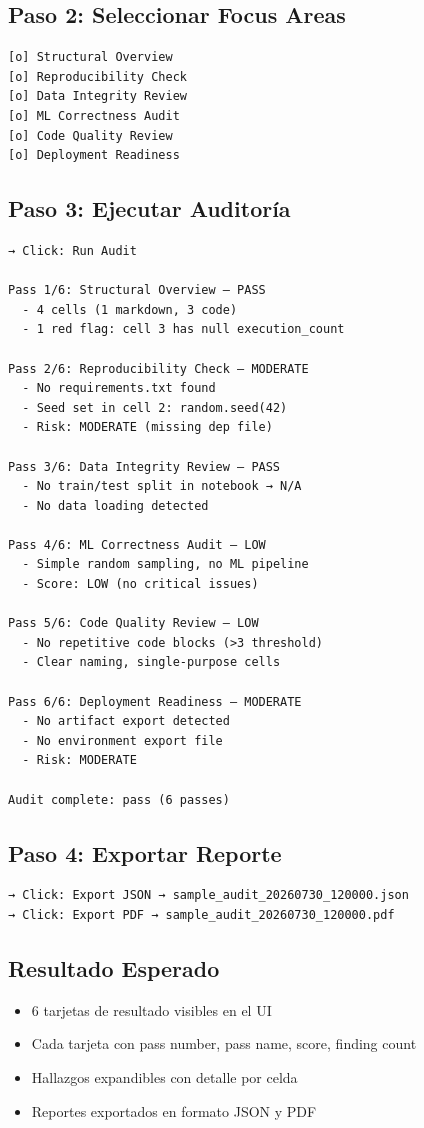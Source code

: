 \documentclass[12pt,a4paper]{article}
\begin{document}
\subsection{Paso 2: Seleccionar Focus Areas}

\begin{verbatim}
[o] Structural Overview
[o] Reproducibility Check
[o] Data Integrity Review
[o] ML Correctness Audit
[o] Code Quality Review
[o] Deployment Readiness
\end{verbatim}

\subsection{Paso 3: Ejecutar Auditoría}

\begin{verbatim}
→ Click: Run Audit

Pass 1/6: Structural Overview — PASS
  - 4 cells (1 markdown, 3 code)
  - 1 red flag: cell 3 has null execution_count

Pass 2/6: Reproducibility Check — MODERATE
  - No requirements.txt found
  - Seed set in cell 2: random.seed(42)
  - Risk: MODERATE (missing dep file)

Pass 3/6: Data Integrity Review — PASS
  - No train/test split in notebook → N/A
  - No data loading detected

Pass 4/6: ML Correctness Audit — LOW
  - Simple random sampling, no ML pipeline
  - Score: LOW (no critical issues)

Pass 5/6: Code Quality Review — LOW
  - No repetitive code blocks (>3 threshold)
  - Clear naming, single-purpose cells

Pass 6/6: Deployment Readiness — MODERATE
  - No artifact export detected
  - No environment export file
  - Risk: MODERATE

Audit complete: pass (6 passes)
\end{verbatim}

\subsection{Paso 4: Exportar Reporte}

\begin{verbatim}
→ Click: Export JSON → sample_audit_20260730_120000.json
→ Click: Export PDF → sample_audit_20260730_120000.pdf
\end{verbatim}

\subsection{Resultado Esperado}
\begin{itemize}
  \item 6 tarjetas de resultado visibles en el UI
  \item Cada tarjeta con pass number, pass name, score, finding count
  \item Hallazgos expandibles con detalle por celda
  \item Reportes exportados en formato JSON y PDF
\end{itemize}
\end{document}
